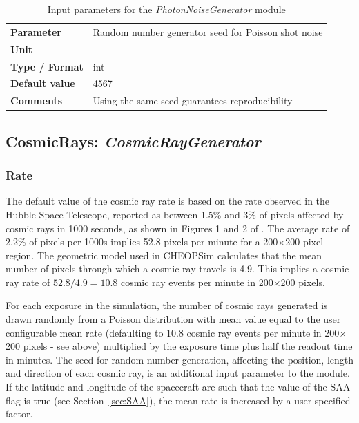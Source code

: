 \documentclass[11pt]{article}      %
\def\HCode#1{}
\def\htmlanchor#1{\HCode{<a id="#1"></a>}}
\begin{document}
\begin{table}[hb]
  \caption{Input parameters for the {\it PhotonNoiseGenerator} module}

  \htmlanchor{photonNoiseSeed}
  \begin{tabular}{| l | p{13cm} |}
    \hline 
    {\bf Parameter} & Random number generator seed for Poisson shot noise\\
    {\bf Unit} & \\
    {\bf Type / Format} & int\\
    {\bf Default value} & 4567\\
    {\bf Comments} & Using the same seed guarantees reproducibility\\
    \hline
  \end{tabular}
  \bigskip

  \label{tab:photonNoise}
\end{table}

\clearpage

\htmlanchor{CosmicRayGenerator}
\subsection{CosmicRays:  {\it CosmicRayGenerator}}
\label{sec:CosmicRayGenerator}

\subsubsection{Rate}

The default value of the cosmic ray rate is based on the rate observed in the Hubble Space Telescope, reported as between 1.5\% and 3\% of pixels affected by cosmic rays in 1000 seconds, as shown in Figures 1 and 2 of \cite{HST_ISR0207}. The average rate of 2.2\% of pixels per 1000s implies 52.8 pixels per minute for a 200$\times$200 pixel region. The geometric model used in CHEOPSim calculates that the mean number of pixels through which a cosmic ray travels is 4.9. This implies a cosmic ray rate of $52.8/4.9 = 10.8$ cosmic ray events per minute in 200$\times$200 pixels.

For each exposure in the simulation, the number of cosmic rays generated is drawn randomly from a Poisson distribution with mean value equal to the user configurable mean rate (defaulting to 10.8 cosmic ray events per minute in 200$\times$200 pixels - see above) multiplied by the exposure time plus half the readout time in minutes. The seed for random number generation, affecting the position, length and direction of each cosmic ray, is an additional input parameter to the module. If the latitude and longitude of the spacecraft are such that the value of the SAA flag is true (see Section~\ref{sec:SAA}), the mean rate is increased by a user specified factor.
\end{document}
